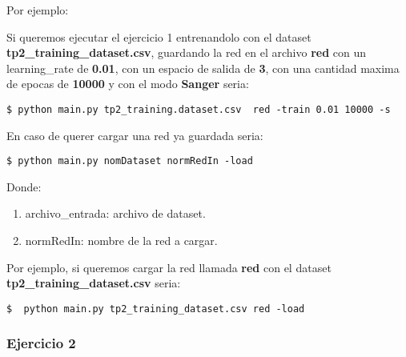 Por ejemplo: 

Si queremos ejecutar el ejercicio 1 entrenandolo con el dataset \textbf{tp2\_training\_dataset.csv}, guardando la red en el archivo 
\textbf{red} con un learning\_rate de \textbf{0.01}, con un espacio de salida de \textbf{3}, con una cantidad maxima de epocas de \textbf{10000} y con el modo \textbf{Sanger} seria:

\begin{verbatim}
$ python main.py tp2_training.dataset.csv  red -train 0.01 10000 -s
\end{verbatim}

En caso de querer cargar una red ya guardada seria:

\begin{verbatim}
$ python main.py nomDataset normRedIn -load
\end{verbatim}

Donde:

\begin{enumerate}
\item archivo\_entrada: archivo de dataset.
\item normRedIn: nombre de la red a cargar.
\end{enumerate}

Por ejemplo, si queremos cargar la red llamada \textbf{red} con el dataset \textbf{tp2\_training\_dataset.csv} seria:

\begin{verbatim}
$  python main.py tp2_training_dataset.csv red -load
\end{verbatim}

\subsubsection{Ejercicio 2}



